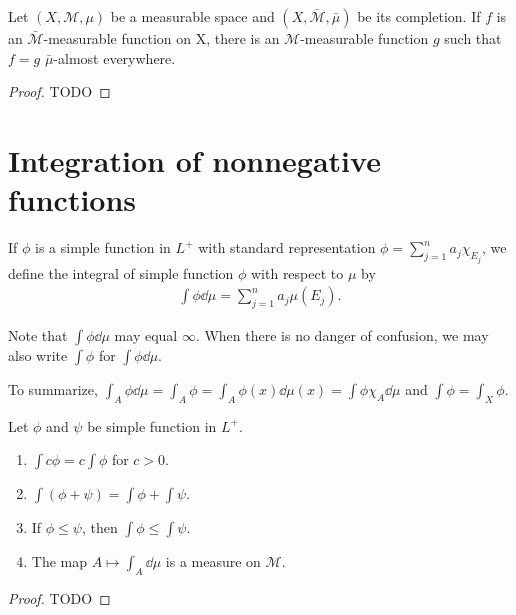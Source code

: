 \begin{proposition}
    Let $(X, \mathcal{M}, \mu)$ be a measurable space and $(X, \bar{\mathcal{M}}, \bar{\mu})$ be its completion.
    If $f$ is an $\bar{\mathcal{M}}$-measurable function on X, there is an $\mathcal{M}$-measurable function $g$ such that $f = g$ $\bar{\mu}$-almost everywhere.
\end{proposition}

\begin{proof}
    TODO
\end{proof}

\section{Integration of nonnegative functions}

\begin{definition}
    If $\phi$ is a simple function in $L^+$ with standard representation $\phi = \sum_{j=1}^{n} a_j \chi_{E_j}$, we define the integral of simple function $\phi$ with respect to $\mu$ by
    \begin{align}
        \int \phi \dd \mu = \sum_{j=1}^{n} a_j \mu(E_j).
    \end{align}
\end{definition}

Note that $\int \phi \dd \mu$ may equal $\infty$.
When there is no danger of confusion, we may also write $\int \phi$ for $\int \phi \dd \mu$.

To summarize, $\int_{A} \phi \dd \mu = \int_{A} \phi = \int_{A} \phi(x) \dd \mu(x) = \int \phi \chi_{A} \dd \mu$ and $\int \phi = \int_{X} \phi$.

\begin{proposition}
    Let $\phi$ and $\psi$ be simple function in $L^+$.
    \begin{enumerate}
        \item $\int c \phi = c \int \phi$ for $c > 0$.
        \item $\int (\phi + \psi) = \int \phi + \int \psi$.
        \item If $\phi \le \psi$, then $\int \phi \le \int \psi$.
        \item The map $A \mapsto \int_{A} \dd \mu$ is a measure on $\mathcal{M}$.
    \end{enumerate}
\end{proposition}

\begin{proof}
    TODO
\end{proof}

